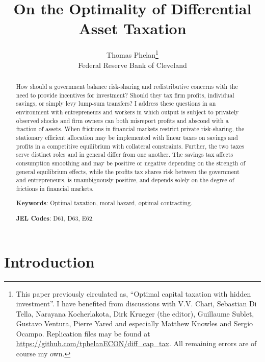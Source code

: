 \documentclass[11pt]{article}
\theoremstyle{plain}
\theoremstyle{definition} %
\begin{document}
\title{On the Optimality of Differential Asset Taxation}

\author{Thomas Phelan\thanks{This paper previously circulated as, ``Optimal capital taxation with hidden investment''. I have benefited from discussions with V.V. Chari, Sebastian Di Tella, Narayana Kocherlakota, Dirk Krueger (the editor), Guillaume Sublet, Gustavo Ventura, Pierre Yared and especially Matthew Knowles and Sergio Ocampo. Replication files may be found at \href{https://github.com/tphelanECON/diff\_cap\_tax}{https://github.com/tphelanECON/diff\_cap\_tax}. All remaining errors are of course my own.} \\ Federal Reserve Bank of Cleveland}

\maketitle


\begin{abstract}
How should a government balance risk-sharing and redistributive concerns with the need to provide incentives for investment? Should they tax firm profits, individual savings, or simply levy lump-sum transfers? I address these questions in an environment with entrepreneurs and workers in which output is subject to privately observed shocks and firm owners can both misreport profits and abscond with a fraction of assets. When frictions in financial markets restrict private risk-sharing, the stationary efficient allocation may be implemented with linear taxes on savings and profits in a competitive equilibrium with collateral constraints. Further, the two taxes serve distinct roles and in general differ from one another. The savings tax affects consumption smoothing and may be positive or negative depending on the strength of general equilibrium effects, while the profits tax shares risk between the government and entrepreneurs, is unambiguously positive, and depends solely on the degree of frictions in financial markets.

\smallskip

\textbf{Keywords}: Optimal taxation, moral hazard, optimal contracting.

\smallskip

\textbf{JEL Codes}: D61, D63, E62. 
\end{abstract} 


\newpage

\section{Introduction} \label{Intro}
\end{document}
